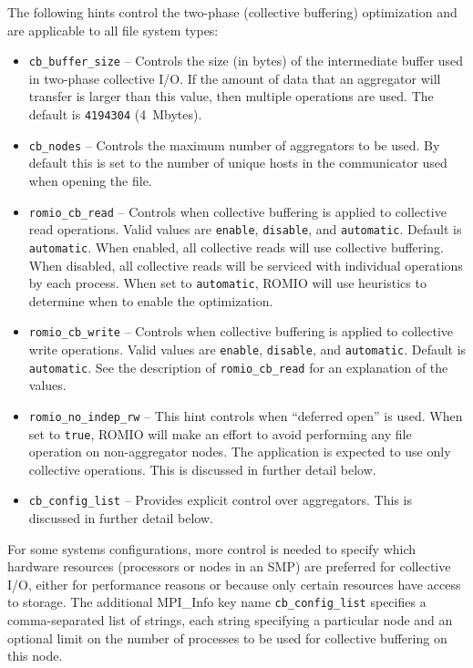 The following hints control the two-phase (collective buffering)
optimization and are applicable to all file system types:
\begin{itemize}
\item \texttt{cb\_buffer\_size} -- Controls the size (in bytes) of the
intermediate buffer used in two-phase collective I/O.  If the amount
of data that an aggregator will transfer is larger than this value,
then multiple operations are used.  The default is \texttt{4194304} (4~Mbytes).
\item \texttt{cb\_nodes} -- Controls the maximum number of aggregators
to be used.  By default this is set to the number of unique hosts in the
communicator used when opening the file.
\item \texttt{romio\_cb\_read} -- Controls when collective buffering is
applied to collective read operations.  Valid values are
\texttt{enable}, \texttt{disable}, and \texttt{automatic}.  Default is
\texttt{automatic}.  When enabled, all collective reads will use
collective buffering.  When disabled, all collective reads will be
serviced with individual operations by each process.  When set to
\texttt{automatic}, ROMIO will use heuristics to determine when to
enable the optimization.
\item \texttt{romio\_cb\_write} -- Controls when collective buffering is
applied to collective write operations.  Valid values are 
\texttt{enable}, \texttt{disable}, and \texttt{automatic}.  Default is 
\texttt{automatic}.  See the description of \texttt{romio\_cb\_read} for
an explanation of the values.
\item \texttt{romio\_no\_indep\_rw} -- This hint controls when ``deferred
open'' is used.  When set to \texttt{true}, ROMIO will make an effort to avoid
performing any file operation on non-aggregator nodes.  The application is
expected to use only collective operations.  This is discussed in further
detail below.
\item \texttt{cb\_config\_list} -- Provides explicit control over 
aggregators.  This is discussed in further detail below.
\end{itemize}

For some systems configurations, more control is needed to specify which
hardware resources (processors or nodes in an SMP) are preferred for
collective I/O, either for performance reasons or because only certain
resources have access to storage.  The additional MPI\_Info key name
\texttt{cb\_config\_list} specifies a comma-separated list of strings,
each string specifying a particular node and an optional limit on the
number of processes to be used for collective buffering on this node.

